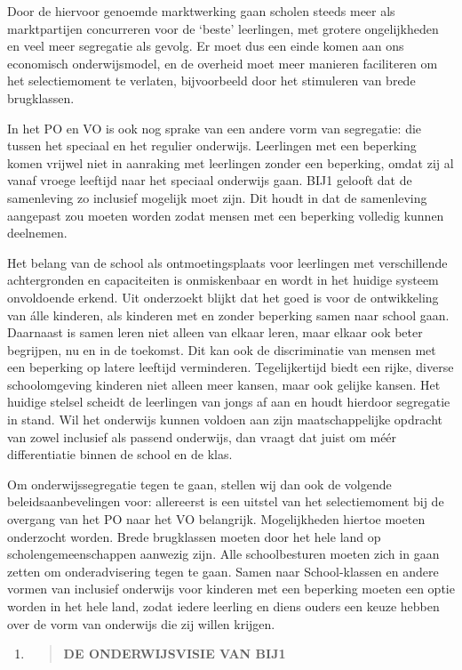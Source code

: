 Door de hiervoor genoemde marktwerking gaan scholen steeds meer als
marktpartijen concurreren voor de `beste' leerlingen, met grotere
ongelijkheden en veel meer segregatie als gevolg. Er moet dus een einde
komen aan ons economisch onderwijsmodel, en de overheid moet meer
manieren faciliteren om het selectiemoment te verlaten, bijvoorbeeld
door het stimuleren van brede brugklassen.

In het PO en VO is ook nog sprake van een andere vorm van segregatie:
die tussen het speciaal en het regulier onderwijs. Leerlingen met een
beperking komen vrijwel niet in aanraking met leerlingen zonder een
beperking, omdat zij al vanaf vroege leeftijd naar het speciaal
onderwijs gaan. BIJ1 gelooft dat de samenleving zo inclusief mogelijk
moet zijn. Dit houdt in dat de samenleving aangepast zou moeten worden
zodat mensen met een beperking volledig kunnen deelnemen.

Het belang van de school als ontmoetingsplaats voor leerlingen met
verschillende achtergronden en capaciteiten is onmiskenbaar en wordt in
het huidige systeem onvoldoende erkend. Uit onderzoekt blijkt dat het
goed is voor de ontwikkeling van álle kinderen, als kinderen met en
zonder beperking samen naar school gaan. Daarnaast is samen leren niet
alleen van elkaar leren, maar elkaar ook beter begrijpen, nu en in de
toekomst. Dit kan ook de discriminatie van mensen met een beperking op
latere leeftijd verminderen. Tegelijkertijd biedt een rijke, diverse
schoolomgeving kinderen niet alleen meer kansen, maar ook gelijke
kansen. Het huidige stelsel scheidt de leerlingen van jongs af aan en
houdt hierdoor segregatie in stand. Wil het onderwijs kunnen voldoen aan
zijn maatschappelijke opdracht van zowel inclusief als passend
onderwijs, dan vraagt dat juist om méér differentiatie binnen de school
en de klas.

Om onderwijssegregatie tegen te gaan, stellen wij dan ook de volgende
beleidsaanbevelingen voor: allereerst is een uitstel van het
selectiemoment bij de overgang van het PO naar het VO belangrijk.
Mogelijkheden hiertoe moeten onderzocht worden. Brede brugklassen moeten
door het hele land op scholengemeenschappen aanwezig zijn. Alle
schoolbesturen moeten zich in gaan zetten om onderadvisering tegen te
gaan. Samen naar School-klassen en andere vormen van inclusief onderwijs
voor kinderen met een beperking moeten een optie worden in het hele
land, zodat iedere leerling en diens ouders een keuze hebben over de
vorm van onderwijs die zij willen krijgen.

\begin{enumerate}
\def\labelenumi{\arabic{enumi}.}
\setcounter{enumi}{6}
\item
  \begin{quote}
  \textbf{DE ONDERWIJSVISIE VAN BIJ1}
  \end{quote}
\end{enumerate}

